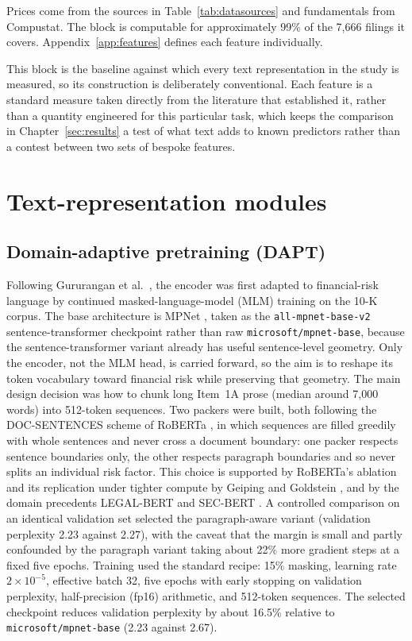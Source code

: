 \documentclass[logo,msc,ai]{infthesis}        %
\begin{document}
Prices come from the sources in Table~\ref{tab:datasources} and fundamentals from Compustat. The block is computable for approximately 99\% of the 7{,}666 filings it covers. Appendix~\ref{app:features} defines each feature individually.

This block is the baseline against which every text representation in the study is measured, so its construction is deliberately conventional. Each feature is a standard measure taken directly from the literature that established it, rather than a quantity engineered for this particular task, which keeps the comparison in Chapter~\ref{sec:results} a test of what text adds to known predictors rather than a contest between two sets of bespoke features.

\section{Text-representation modules}
\label{sec:text}

\subsection{Domain-adaptive pretraining (DAPT)}
Following Gururangan et al.\ \cite{gururangan2020don}, the encoder was first adapted to financial-risk language by continued masked-language-model (MLM) training on the 10-K corpus. The base architecture is MPNet \cite{song2020mpnet}, taken as the \texttt{all-mpnet-base-v2} sentence-transformer checkpoint rather than raw \texttt{microsoft/mpnet-base}, because the sentence-transformer variant already has useful sentence-level geometry. Only the encoder, not the MLM head, is carried forward, so the aim is to reshape its token vocabulary toward financial risk while preserving that geometry. The main design decision was how to chunk long Item~1A prose (median around 7{,}000 words) into 512-token sequences. Two packers were built, both following the DOC-SENTENCES scheme of RoBERTa \cite{liu2019roberta}, in which sequences are filled greedily with whole sentences and never cross a document boundary: one packer respects sentence boundaries only, the other respects paragraph boundaries and so never splits an individual risk factor. This choice is supported by RoBERTa's ablation and its replication under tighter compute by Geiping and Goldstein \cite{geiping2023cramming}, and by the domain precedents LEGAL-BERT \cite{chalkidis2020legal} and SEC-BERT \cite{loukas2022finer}. A controlled comparison on an identical validation set selected the paragraph-aware variant (validation perplexity 2.23 against 2.27), with the caveat that the margin is small and partly confounded by the paragraph variant taking about 22\% more gradient steps at a fixed five epochs. Training used the standard recipe: 15\% masking, learning rate $2\times10^{-5}$, effective batch 32, five epochs with early stopping on validation perplexity, half-precision (fp16) arithmetic, and 512-token sequences. The selected checkpoint reduces validation perplexity by about 16.5\% relative to \texttt{microsoft/mpnet-base} (2.23 against 2.67).
\end{document}
